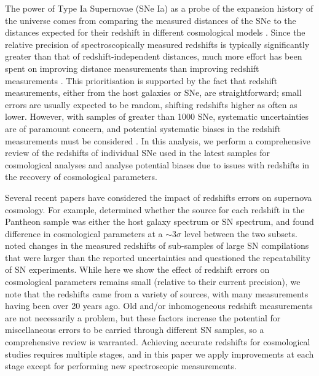 \documentclass[
  journal=pasa,
  manuscript=research-paper,
  year=2022,
]{cup-journal}
\begin{document}
The power of Type Ia Supernovae (SNe Ia) as a probe of the expansion history of the universe comes from comparing the measured distances of the SNe to the distances expected for their redshift in different cosmological models \citep{Riess1998,Perlmutter1999,WoodVasey2007,Kessler2009,Betoule2014,Scolnic2018,DES2019}. 
Since the relative precision of spectroscopically measured redshifts is typically significantly greater than that of redshift-independent distances, much more effort has been spent on improving distance measurements than improving redshift measurements \citep[e.g.][]{Phillips1993, Phillips1999, Goldhaber2001, Guy2007, Jha2007, Hicken2009, Kessler2009, Scolnic2015, Kessler2017, Brout2019, Kessler2019, Lasker2019}.  
This prioritisation is supported by the fact that redshift measurements, either from the host galaxies or SNe, are straightforward; small errors are usually expected to be random, shifting redshifts higher as often as lower. 
However, with samples of greater than 1000 SNe, systematic uncertainties are of paramount concern, and potential systematic biases in the redshift measurements must be considered \citep[e.g.][]{Huterer2004,Wojtak2015,Davis2019,Steinhardt2020,Mitra2021}.  
In this analysis, we perform a comprehensive review of the redshifts of individual SNe used in the latest samples for cosmological analyses and analyse potential biases due to issues with redshifts in the recovery of cosmological parameters.

Several recent papers have considered the impact of redshifts errors on supernova cosmology.
For example, \citet{Steinhardt2020} determined whether the source for each redshift in the Pantheon sample \citep{Scolnic2018} was either the host galaxy spectrum or SN spectrum, and found difference in cosmological parameters at a $\sim 3\sigma$ level between the two subsets. 
\citet{Rameez2021} noted changes in the measured redshifts of sub-samples of large SN compilations that were larger than the reported uncertainties and questioned the repeatability of SN experiments.  
While here we show the effect of redshift errors on cosmological parameters remains small (relative to their current precision), we note that the redshifts came from a variety of sources, with many measurements having been over 20 years ago. 
Old and/or inhomogeneous redshift measurements are not necessarily a problem, but these factors increase the potential for miscellaneous errors to be carried through different SN samples, so a comprehensive review is warranted.
Achieving accurate redshifts for cosmological studies requires multiple stages, and in this paper we apply improvements at each stage except for performing new spectroscopic measurements.
\end{document}
